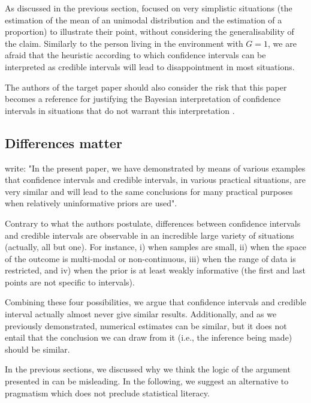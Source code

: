 \documentclass[a4paper,man,natbib,floatsintext,donotrepeattitle]{apa6}
\begin{document}
As discussed in the previous section, \cite{albers_credible_2018} focused on very simplistic situations (the estimation of the mean of an unimodal distribution and the estimation of a proportion) to illustrate their point, without considering the generalisability of the claim. Similarly to the person living in the environment with $G = 1$, we are afraid that the heuristic according to which confidence intervals can be interpreted as credible intervals will lead to disappointment in most situations.

The authors of the target paper should also consider the risk that this paper becomes a reference for justifying the Bayesian interpretation of confidence intervals in situations that do not warrant this interpretation \citep[cf. various examples in][]{morey_fallacy_2015}.

\subsection{Differences matter}

\cite{albers_credible_2018} write: "In the present paper, we have demonstrated by means of various examples that confidence intervals and credible intervals, in various practical situations, are very similar and will lead to the same conclusions for many practical purposes when relatively uninformative priors are used".

Contrary to what the authors postulate, differences between confidence intervals and credible intervals are observable in an incredible large variety of situations (actually, all but one). For instance, i) when samples are small, ii) when the space of the outcome is multi-modal or non-continuous, iii) when the range of data is restricted, and iv) when the prior is at least weakly informative (the first and last points are not specific to intervals).

Combining these four possibilities, we argue that confidence intervals and credible interval actually almost never give similar results. Additionally, and as we previously demonstrated, numerical estimates can be similar, but it does not entail that the conclusion we can draw from it (i.e., the inference being made) should be similar.

In the previous sections, we discussed why we think the logic of the argument presented in \cite{albers_credible_2018} can be misleading. In the following, we suggest an alternative to pragmatism which does not preclude statistical literacy.
\end{document}
